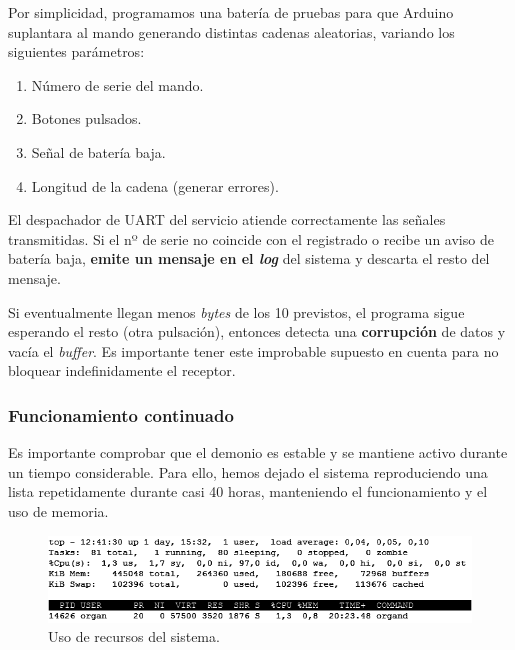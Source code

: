 \smallskip

Por simplicidad, programamos una batería de pruebas para que Arduino suplantara al mando generando distintas cadenas aleatorias, variando los siguientes parámetros:

\begin{enumerate}
	\item Número de serie del mando.
	\item Botones pulsados.
	\item Señal de batería baja.
	\item Longitud de la cadena (generar errores).
\end{enumerate}

El despachador de \acrshort{UART} del servicio atiende correctamente las señales transmitidas. Si el nº de serie no coincide con el registrado o recibe un aviso de batería baja, \textbf{emite un mensaje en el \textit{log}} del sistema y descarta el resto del mensaje.

Si eventualmente llegan menos \textit{bytes} de los 10 previstos, el programa sigue esperando el resto (otra pulsación), entonces detecta una \textbf{corrupción} de datos y vacía el \textit{buffer}. Es importante tener este improbable supuesto en cuenta para no bloquear indefinidamente el receptor.

\subsubsection{Funcionamiento continuado}

Es importante comprobar que el demonio es estable y se mantiene activo durante un tiempo considerable. Para ello, hemos dejado el sistema reproduciendo una lista repetidamente durante casi 40 horas, manteniendo el funcionamiento y el uso de memoria.

\smallskip

\begin{figure}[H]
	\noindent \begin{centering}
		\includegraphics[width=\linewidth*3/4]{capitulo6/cap_top}
		\par\end{centering}
	\smallskip
	\caption{\label{fig:cap_top} Uso de recursos del sistema.}
\end{figure} 

